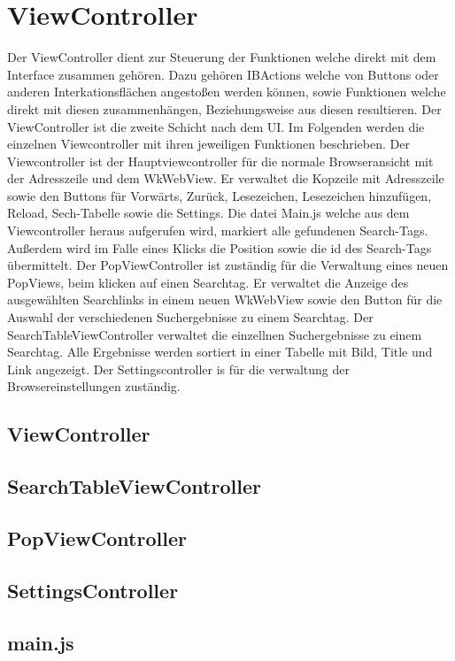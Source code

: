 
\section{ViewController}
Der ViewController dient zur Steuerung der Funktionen welche direkt mit dem Interface zusammen gehören. Dazu gehören
IBActions welche von Buttons oder anderen Interkationsflächen angestoßen werden können, sowie Funktionen welche direkt mit diesen zusammenhängen, Beziehungsweise aus diesen resultieren. Der ViewController ist die zweite Schicht nach dem UI. Im
Folgenden werden die einzelnen Viewcontroller mit ihren jeweiligen Funktionen beschrieben.
Der Viewcontroller ist der Hauptviewcontroller für die normale Browseransicht mit der Adresszeile und dem WkWebView. Er verwaltet die Kopzeile mit Adresszeile sowie den Buttons für Vorwärts, Zurück, Lesezeichen, Lesezeichen hinzufügen, Reload, Sech-Tabelle sowie die Settings. Die datei Main.js welche aus dem Viewcontroller heraus aufgerufen wird, markiert alle gefundenen Search-Tags. Außerdem wird im Falle eines Klicks die Position sowie die id des Search-Tags übermittelt.
Der PopViewController ist zuständig für die Verwaltung eines neuen PopViews, beim klicken auf einen Searchtag. Er verwaltet die Anzeige des ausgewählten Searchlinks in einem neuen WkWebView sowie den Button für die Auswahl der verschiedenen Suchergebnisse zu einem Searchtag.
Der SearchTableViewController verwaltet die einzellnen Suchergebnisse zu einem Searchtag. Alle Ergebnisse werden sortiert in einer Tabelle mit Bild, Title und Link angezeigt.
Der Settingscontroller is für die verwaltung der Browsereinstellungen zuständig.
\subsection{ViewController}
\subsection{SearchTableViewController}
\subsection{PopViewController}
\subsection{SettingsController}
\subsection{main.js}

